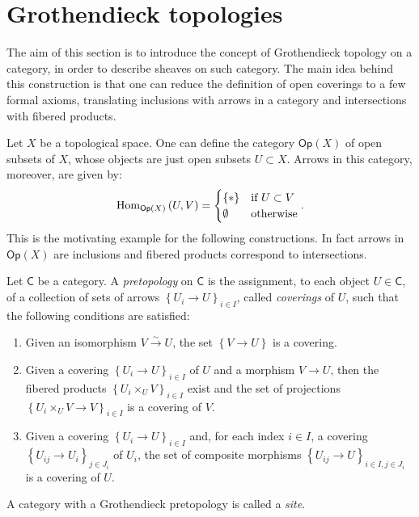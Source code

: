 \section{Grothendieck topologies}
The aim of this section is to introduce
the concept of Grothendieck topology on a category,
in order to describe sheaves on such category.
The main idea behind this construction is that one can reduce
the definition of open coverings to a few formal axioms, translating
inclusions with arrows in a category and
intersections with fibered products.


\begin{rem}
	Let $X$ be a topological space. 
	One can define the category $\mathsf{Op}(X)$ of open subsets of $X$, whose
	objects are just open subsets $U \subset X$.
	Arrows in this category, moreover, are given by:
	\begin{equation*}
	\operatorname{Hom}_{\mathsf{Op}(X)} \left( U, V \right) =
	\begin{cases}
		\left\{ * \right\} & \text{if } U \subset V\\
		\emptyset & \text{otherwise}
	\end{cases} 
	.\end{equation*}
	This is the motivating example for the following constructions.
	In fact arrows in $\mathsf{Op}(X)$ are inclusions and
	fibered products correspond to intersections.
\end{rem}


\begin{defn}[Sites]
	Let $\mathsf{C}$ be a category. 
	A \emph{pretopology} on $\mathsf{C}$ is the assignment, to each object $U \in \mathsf{C}$,
	of a collection of sets of arrows $\left\{ U_{ i } \to U \right\}_{ i \in I }$,
	called \emph{coverings} of $U$, such that the following conditions are satisfied:
	\begin{enumerate}
		\item Given an isomorphism $V \xrightarrow{\sim} U$, the set $\left\{ V \to U \right\}$
			is a covering.
		\item Given a covering $\left\{ U_{ i } \to U \right\}_{ i \in I }$
			of $U$ and a morphism $V \to U$, then the fibered products
			$\left\{ U_i \times_{ U } V \right\}_{i \in I}$ exist
			and the set of projections
			$\left\{ U_i \times_{ U } V \to V \right\}_{ i \in I }$
			is a covering of $V$.
		\item Given a covering $\left\{ U_{ i } \to U \right\}_{ i \in I }$
			and, for each index $i \in I$, a covering 
			$\left\{ U_{ ij } \to U_i \right\}_{ j \in J_i }$ of $U_i$,
			the set of composite morphisms
			$\left\{ U_{ ij } \to U \right\}_{ i \in I, j \in J_i }$
			is a covering of $U$.
	\end{enumerate}
	A category with a Grothendieck pretopology is called a \emph{site}.
\end{defn}


